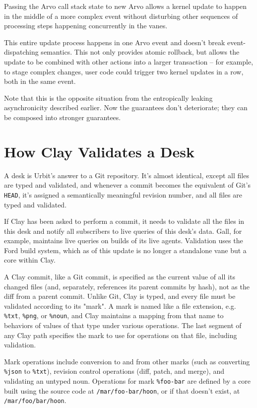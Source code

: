 \documentclass[twoside]{article}
\begin{document}
Passing the Arvo call stack state to new Arvo allows a kernel update to happen in the middle of a more complex event without disturbing other sequences of processing steps happening concurrently in the vanes.

This entire update process happens in one Arvo event and doesn’t break event-dispatching semantics. This not only provides atomic rollback, but allows the update to be combined with other actions into a larger transaction – for example, to stage complex changes, user code could trigger two kernel updates in a row, both in the same event.

Note that this is the opposite situation from the entropically leaking asynchronicity described earlier. Now the guarantees don’t deteriorate; they can be composed into stronger guarantees.


\section{How Clay Validates a Desk}

A desk is Urbit's answer to a Git repository. It's almost identical, except all files are typed and validated, and whenever a commit becomes the equivalent of Git’s \lstinline[style=inlinecode]{HEAD}, it’s assigned a semantically meaningful revision number, and all files are typed and validated.

If Clay has been asked to perform a commit, it needs to validate all the files in this desk and notify all subscribers to live queries of this desk's data. Gall, for example, maintains live queries on builds of its live agents. Validation uses the Ford build system, which as of this update is no longer a standalone vane but a core within Clay.

A Clay commit, like a Git commit, is specified as the current value of all its changed files (and, separately, references its parent commits by hash), not as the diff from a parent commit. Unlike Git, Clay is typed, and every file must be validated according to its "mark". A mark is named like a file extension, e.g. \lstinline[style=inlinecode]{%txt}, \lstinline[style=inlinecode]{%png}, or \lstinline[style=inlinecode]{%noun}, and Clay maintains a mapping from that name to behaviors of values of that type under various operations. The last segment of any Clay path specifies the mark to use for operations on that file, including validation.

Mark operations include conversion to and from other marks (such as converting \lstinline[style=inlinecode]{%json} to \lstinline[style=inlinecode]{%txt}), revision control operations (diff, patch, and merge), and validating an untyped noun. Operations for mark \lstinline[style=inlinecode]{%foo-bar} are defined by a core built using the source code at \lstinline[style=inlinecode]{/mar/foo-bar/hoon}, or if that doesn't exist, at \lstinline[style=inlinecode]{/mar/foo/bar/hoon}.
\end{document}
